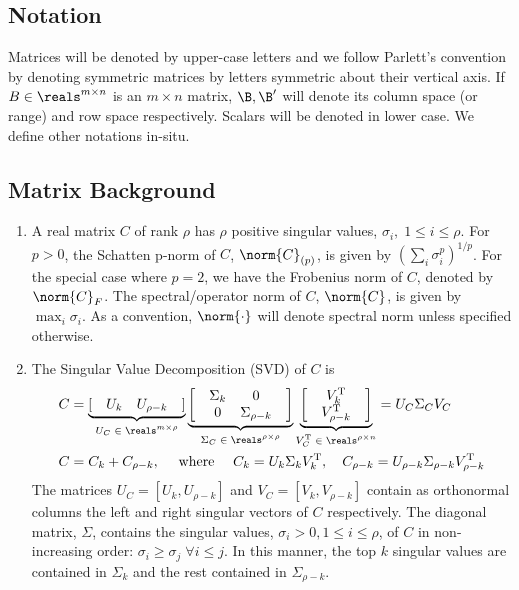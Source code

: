\subsection{Notation}
Matrices will be denoted by upper-case letters and we follow Parlett's convention by denoting symmetric matrices by letters symmetric about their vertical axis. If $B \in \reals^{m \times n}$ is an $m \times n$ matrix, $\B, \B'$ will denote its column space (or range) and row space respectively. Scalars will be denoted in lower case. We define other notations in-situ. 

\subsection{Matrix Background}
\begin{enumerate}
\item A real matrix $C$ of rank $\rho$ has $\rho$ positive singular values, $\sigma_i, \; 1 \leq i \leq \rho$. For $p > 0$, the Schatten p-norm of $C$, $\norm{C}_{(p)}$, is given by $\left( \sum_i \sigma_i ^p \right)^{1/p}$. For the special case where $p=2$, we have the Frobenius norm of $C$, denoted by $\norm{C}_F$. The spectral/operator norm of $C$, $\norm{C}$, is given by $\displaystyle \max_i \sigma_i$. As a convention, $\norm{ \cdot }$ will denote spectral norm unless specified otherwise. 

\item The Singular Value Decomposition (SVD) of $C$ is
\begin{align*}
C &= \underbrace{[ \quad U_k \quad U_{\rho - k} \quad ]}_\text{$U_C \in \reals^{m \times \rho}$}
\underbrace{\begin{bmatrix}
&\Sigma_k & 0 &\\
&0 & \Sigma_{\rho - k}&
\end{bmatrix}}_\text{$\Sigma_C \in \reals^{\rho \times \rho}$}
\underbrace{\begin{bmatrix}
&V_k^{\text{T}}&\\
&V_{\rho - k}^{\text{T}}&
\end{bmatrix}}_\text{$V_C^{\text{T}} \in \reals^{\rho \times n}$} = U_C\Sigma_C V_C\\
C & = C_k + C_{\rho - k}, \quad \text{ where } \quad C_k  = U_k\Sigma_kV_k^{\text{T}}, \quad  C_{\rho - k}  = U_{\rho - k}\Sigma_{\rho - k}V_{\rho -k}^{\text{T}}
\end{align*} 
The matrices $U_C = [U_k, U_{\rho - k}]$ and $V_C = [V_k, V_{\rho - k}]$ contain as orthonormal columns the left and right singular vectors of $C$ respectively. The diagonal matrix, $\Sigma$, contains the singular values, $\sigma_i > 0, 1 \leq i \leq \rho$, of $C$ in non-increasing order: $\sigma_{i} \geq \sigma_{j}\; \forall i \leq j$. In this manner, the top $k$ singular values are contained in $\Sigma_k$ and the rest contained in $\Sigma_{\rho - k}$. 


\end{enumerate}
